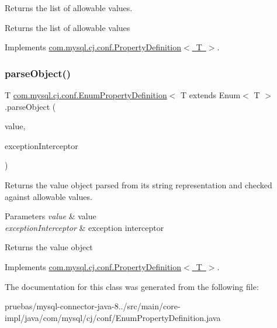 Returns the list of allowable values.

\begin{DoxyReturn}{Returns}
the list of allowable values 
\end{DoxyReturn}


Implements \mbox{\hyperlink{interfacecom_1_1mysql_1_1cj_1_1conf_1_1_property_definition_af0b3b3dc66dde20cb65b69eb2ec70738}{com.\+mysql.\+cj.\+conf.\+Property\+Definition$<$ T $>$}}.

\mbox{\label{classcom_1_1mysql_1_1cj_1_1conf_1_1_enum_property_definition_a00a259a5d83a0a7c6522309ff44146ba}} 
\subsubsection{\texorpdfstring{parse\+Object()}{parseObject()}}
{\footnotesize\ttfamily T \mbox{\hyperlink{classcom_1_1mysql_1_1cj_1_1conf_1_1_enum_property_definition}{com.\+mysql.\+cj.\+conf.\+Enum\+Property\+Definition}}$<$ T extends Enum$<$ T $>$.parse\+Object (\begin{DoxyParamCaption}\item[{String}]{value,  }\item[{\mbox{\hyperlink{interfacecom_1_1mysql_1_1cj_1_1exceptions_1_1_exception_interceptor}{Exception\+Interceptor}}}]{exception\+Interceptor }\end{DoxyParamCaption})}

Returns the value object parsed from it\textquotesingle{}s string representation and checked against allowable values.


\begin{DoxyParams}{Parameters}
{\em value} & value \\
\hline
{\em exception\+Interceptor} & exception interceptor\\
\hline
\end{DoxyParams}
\begin{DoxyReturn}{Returns}
the value object 
\end{DoxyReturn}


Implements \mbox{\hyperlink{interfacecom_1_1mysql_1_1cj_1_1conf_1_1_property_definition_a6abfb25b6102c876eddc4f10aca5687c}{com.\+mysql.\+cj.\+conf.\+Property\+Definition$<$ T $>$}}.



The documentation for this class was generated from the following file\+:\begin{DoxyCompactItemize}
\item 
pruebas/mysql-\/connector-\/java-\/8../src/main/core-\/impl/java/com/mysql/cj/conf/Enum\+Property\+Definition.\+java\end{DoxyCompactItemize}
